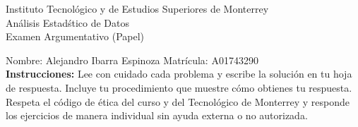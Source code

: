 \documentclass[10pt]{report}
\begin{document}
\newpage



\begin{center}
{\large Instituto Tecnol\'{o}gico y de Estudios Superiores de Monterrey \\
An\'alisis Estad\'stico de Datos } \\
Examen Argumentativo (Papel)
\end{center}

Nombre: \underline{\hspace*{.2in}}
Alejandro Ibarra Espinoza
\underline{\hspace*{.2in}} \quad Matr\'icula:\underline{\hspace*{.2in}}
A01743290
\underline{\hspace*{.2in}} \\

{\bf Instrucciones:} Lee con cuidado cada problema y escribe la soluci\'on
en tu hoja de respuesta. Incluye tu procedimiento que muestre c\'omo obtienes tu respuesta.  Respeta el c\'odigo de \'etica del curso y del Tecnol\'ogico de Monterrey y responde los ejercicios de manera individual sin ayuda externa o no autorizada.
\end{document}
